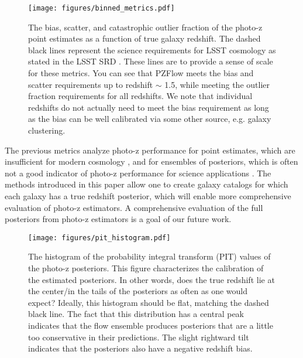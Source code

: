 \documentclass[twocolumn]{aastex631}
\begin{document}
\begin{figure*}[t!]
    \begin{centering}
        \texttt{[image: figures/binned\_metrics.pdf]}
        \caption{
            The bias, scatter, and catastrophic outlier fraction of the photo-z point estimates as a function of true galaxy redshift.
            The dashed black lines represent the science requirements for LSST cosmology as stated in the LSST SRD \citep{descSRD}.
            These lines are to provide a sense of scale for these metrics.
            You can see that PZFlow meets the bias and scatter requirements up to redshift $\sim$ 1.5, while meeting the outlier fraction requirements for all redshifts.
            We note that individual redshifts do not actually need to meet the bias requirement as long as the bias can be well calibrated via some other source, e.g. galaxy clustering.
        }
        \label{fig:binned-metrics}
    \end{centering}
\end{figure*}

The previous metrics analyze photo-z performance for point estimates, which are insufficient for modern cosmology \citep{newman2022}, and for ensembles of posteriors, which is often not a good indicator of photo-z performance for science applications \citep{schmidt2020}.
The methods introduced in this paper allow one to create galaxy catalogs for which each galaxy has a true redshift posterior, which will enable more comprehensive evaluation of photo-z estimators.
A comprehensive evaluation of the full posteriors from photo-z estimators is a goal of our future work.

\begin{figure}[t!]
    \begin{centering}
        \texttt{[image: figures/pit\_histogram.pdf]}
        \caption{
            The histogram of the probability integral transform (PIT) values of the photo-z posteriors.
            This figure characterizes the calibration of the estimated posteriors.
            In other words, does the true redshift lie at the center/in the tails of the posteriors as often as one would expect?
            Ideally, this histogram should be flat, matching the dashed black line.
            The fact that this distribution has a central peak indicates that the flow ensemble produces posteriors that are a little too conservative in their predictions.
            The slight rightward tilt indicates that the posteriors also have a negative redshift bias.
        }
        \label{fig:pit-histogram}
    \end{centering}
\end{figure}
\end{document}
